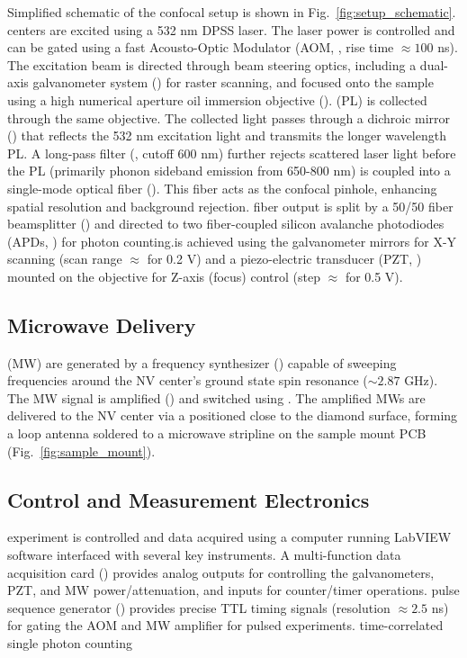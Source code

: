 \documentclass[aps,prb,twocolumn,superscriptaddress,floatfix,longbibliography,citeautoscript]{revtex4-2}
\begin{document}
Simplified schematic of the confocal setup is shown in Fig.~\ref{fig:setup_schematic}. \nNV centers are excited using a  532 nm DPSS laser. The laser power is controlled and can be gated using a fast Acousto-Optic Modulator (AOM, , rise time $\approx 100$ ns). The excitation beam is directed through beam steering optics, including a dual-axis galvanometer system () for raster scanning, and focused onto the sample using a high numerical aperture oil immersion objective (). \nPhotoluminescence (PL) is collected through the same objective. The collected light passes through a dichroic mirror () that reflects the 532 nm excitation light and transmits the longer wavelength PL. A long-pass filter (, cutoff 600 nm) further rejects scattered laser light before the PL (primarily phonon sideband emission from 650-800 nm) is coupled into a single-mode optical fiber (). This fiber acts as the confocal pinhole, enhancing spatial resolution and background rejection. \nThe fiber output is split by a 50/50 fiber beamsplitter () and directed to two fiber-coupled silicon avalanche photodiodes (APDs, ) for photon counting.\nPositioning is achieved using the galvanometer mirrors for X-Y scanning (scan range $\approx$  for 0.2 V) and a piezo-electric transducer (PZT, ) mounted on the objective for Z-axis (focus) control (step $\approx$  for 0.5 V).\n\n\subsection{\label{sec:mw}Microwave Delivery}\nMicrowaves (MW) are generated by a frequency synthesizer () capable of sweeping frequencies around the NV center's ground state spin resonance ($\sim 2.87$ GHz). The MW signal is amplified () and switched using . The amplified MWs are delivered to the NV center via a  positioned close to the diamond surface, forming a loop antenna soldered to a microwave stripline on the sample mount PCB (Fig.~\ref{fig:sample_mount}).\n\n\subsection{\label{sec:control}Control and Measurement Electronics}\nThe experiment is controlled and data acquired using a computer running LabVIEW software interfaced with several key instruments. A multi-function data acquisition card () provides analog outputs for controlling the galvanometers, PZT, and MW power/attenuation, and inputs for counter/timer operations. \nA pulse sequence generator () provides precise TTL timing signals (resolution $\approx 2.5$ ns) for gating the AOM and MW amplifier for pulsed experiments. \nA time-correlated single photon counting 
\end{document}
